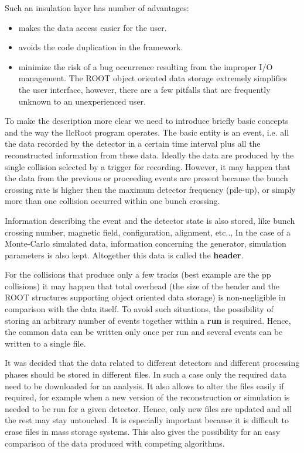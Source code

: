 \documentclass[12pt,a4paper,twoside]{article}
\begin{document}
{Such an insulation layer has number of advantages:
\begin{itemize}
\item makes the data access easier for the user. 
\item avoids the code duplication in the framework.
\item minimize the risk of a bug occurrence resulting from the improper I/O management.
  The ROOT object oriented data storage extremely simplifies the user interface,
  however, there are a few pitfalls that are frequently unknown to an 
  unexperienced user. 
\end{itemize}

To make the description more clear we need to introduce briefly  
basic concepts and the way the IlcRoot program operates. 
The basic entity is an event, i.e. all the data recorded by the 
detector in a certain time interval plus all the reconstructed information 
from these data. Ideally the data are produced by the single collision
selected by a trigger for recording. However, it may happen that the data
from the previous or proceeding events are present because the bunch 
crossing rate is higher then the maximum detector frequency (pile-up), 
or simply more than one collision occurred within one bunch crossing.

Information describing the event and the detector state is also
stored, like bunch crossing number, magnetic field, configuration, alignment, etc..,
In the case of a Monte-Carlo simulated data, information concerning the 
generator, simulation parameters is also kept. Altogether this data
is called the \textbf{header}. 

For the collisions that produce only a few tracks (best example 
are the pp collisions) it may happen that total overhead 
(the size of the header and the ROOT structures supporting object oriented 
data storage) is non-negligible in comparison with the data itself.
To avoid such situations, the possibility of storing an arbitrary number 
of events together within a \textbf{run} is required. Hence, the common data can be 
written only once per run and several events can be written to a single file.

It was decided that the data related to different detectors 
and different processing phases should be stored in different files.
In such a case only the required data need to be downloaded for an analysis.
It also allows to alter the files easily if required, 
for example when a new version of the reconstruction or simulation is needed 
to be run for a given detector. Hence, only new files are updated
and all the rest may stay untouched. It is especially important because
it is difficult to erase files in mass storage systems.
This also gives the possibility for an easy comparison of the data produced with 
competing algorithms. 

}
\end{document}
